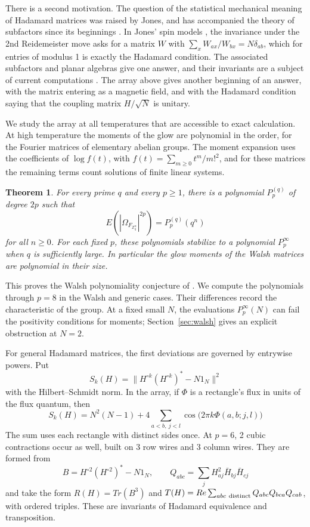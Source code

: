 \documentclass[11pt,a4paper]{article}
\newtheorem{introthm}{Theorem}
\theoremstyle{remark}
\begin{document}
There is a second motivation. The question of the statistical mechanical meaning of Hadamard matrices was raised by Jones, and has accompanied the theory of subfactors since its beginnings \cite{jo1}. In Jones' spin models \cite{jo2}, the invariance under the 2nd Reidemeister move asks for a matrix $W$ with $\sum_xW_{ax}/W_{bx}=N\delta_{ab}$, which for entries of modulus 1 is exactly the Hadamard condition. The associated subfactors and planar algebras \cite{jo3,jo4} give one answer, and their invariants are a subject of current computations \cite{abf}. The array above gives another beginning of an answer, with the matrix entering as a magnetic field, and with the Hadamard condition saying that the coupling matrix $H/\sqrt N$ is unitary.

We study the array at all temperatures that are accessible to exact calculation. At high temperature the moments of the glow are polynomial in the order, for the Fourier matrices of elementary abelian groups. The moment expansion uses the coefficients of $\log f(t)$, with $f(t)=\sum_{m\ge0}t^m/m!^2$, and for these matrices the remaining terms count solutions of finite linear systems.

\begin{samepage}
\begin{introthm}\label{intro:poly}
For every prime $q$ and every $p\ge1$, there is a polynomial $P^{(q)}_p$ of degree $2p$ such that
\[
 E\left(|\Omega_{F_{\mathbb Z_q^n}}|^{2p}\right)=P^{(q)}_p(q^n)
\]
for all $n\ge0$. For each fixed $p$, these polynomials stabilize to a polynomial $P^\infty_p$ when $q$ is sufficiently large. In particular the glow moments of the Walsh matrices are polynomial in their size.
\end{introthm}
\end{samepage}

This proves the Walsh polynomiality conjecture of \cite{banica}. We compute the polynomials through $p=8$ in the Walsh and generic cases. Their differences record the characteristic of the group. At a fixed small $N$, the evaluations $P^\infty_p(N)$ can fail the positivity conditions for moments; Section~\ref{sec:walsh} gives an explicit obstruction at $N=2$.

For general Hadamard matrices, the first deviations are governed by entrywise powers. Put
\[
 S_k(H)=\|H^{\circ k}(H^{\circ k})^*-N1_N\|^2
\]
with the Hilbert--Schmidt norm. In the array, if $\Phi$ is a rectangle's flux in units of the flux quantum, then
\[
 S_k(H)=N^2(N-1)+4\sum_{a<b,\ j<l}\cos\big(2\pi k\Phi(a,b;j,l)\big)
\]
The sum uses each rectangle with distinct sides once. At $p=6$, 2 cubic contractions occur as well, built on 3 row wires and 3 column wires. They are formed from
\[
 B=H^{\circ2}(H^{\circ2})^*-N1_N,\qquad
 Q_{abc}=\sum_j H_{aj}^2\bar H_{bj}\bar H_{cj}
\]
and take the form $R(H)=Tr(B^3)$ and
$T(H)=Re\sum_{abc\ {\rm distinct}}Q_{abc}Q_{bca}Q_{cab}$, with ordered triples. These are invariants of Hadamard equivalence and transposition.
\end{document}
